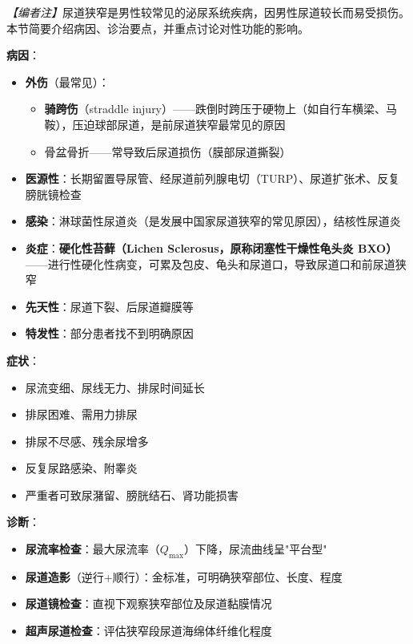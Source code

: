 \documentclass[12pt,a4paper,twoside]{ctexbook}
\begin{document}
\noindent\textit{【编者注】}尿道狭窄是男性较常见的泌尿系统疾病，因男性尿道较长而易受损伤。本节简要介绍病因、诊治要点，并重点讨论对性功能的影响。

\vspace{0.5em}
\noindent\textbf{病因}：

\begin{itemize}[leftmargin=2cm]
	\item \textbf{外伤}（最常见）：
	\begin{itemize}
		\item \textbf{骑跨伤}（straddle injury）——跌倒时跨压于硬物上（如自行车横梁、马鞍），压迫球部尿道，是前尿道狭窄最常见的原因
		\item 骨盆骨折——常导致后尿道损伤（膜部尿道撕裂）
	\end{itemize}
	\item \textbf{医源性}：长期留置导尿管、经尿道前列腺电切（TURP）、尿道扩张术、反复膀胱镜检查
	\item \textbf{感染}：淋球菌性尿道炎（是发展中国家尿道狭窄的常见原因），结核性尿道炎
	\item \textbf{炎症}：\textbf{硬化性苔藓（Lichen Sclerosus，原称闭塞性干燥性龟头炎 BXO）}——进行性硬化性病变，可累及包皮、龟头和尿道口，导致尿道口和前尿道狭窄
	\item \textbf{先天性}：尿道下裂、后尿道瓣膜等
	\item \textbf{特发性}：部分患者找不到明确原因
\end{itemize}

\vspace{0.5em}
\noindent\textbf{症状}：
\begin{itemize}[leftmargin=2cm]
	\item 尿流变细、尿线无力、排尿时间延长
	\item 排尿困难、需用力排尿
	\item 排尿不尽感、残余尿增多
	\item 反复尿路感染、附睾炎
	\item 严重者可致尿潴留、膀胱结石、肾功能损害
\end{itemize}

\vspace{0.5em}
\noindent\textbf{诊断}：
\begin{itemize}[leftmargin=2cm]
	\item \textbf{尿流率检查}：最大尿流率（$Q_{\max}$）下降，尿流曲线呈"平台型"
	\item \textbf{尿道造影}（逆行+顺行）：金标准，可明确狭窄部位、长度、程度
	\item \textbf{尿道镜检查}：直视下观察狭窄部位及尿道黏膜情况
	\item \textbf{超声尿道检查}：评估狭窄段尿道海绵体纤维化程度
\end{itemize}
\end{document}
